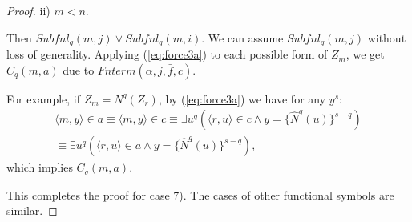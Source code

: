 \documentclass{asl}
\theoremstyle{definition}
\begin{document}
\begin{proof}
ii) $m<n$.

Then $Subfnl_q(m,j)\vee Subfnl_q(m,i)$. We can assume $Subfnl_q(m,j)$ without loss of generality. Applying (\ref{eq:force3a}) to each possible form of $Z_m$, we get $C_q(m,a)$ due to $Fnterm(\alpha,j,\bar{f},c)$. 

For example, if $Z_m=N^q(Z_r)$, by (\ref{eq:force3a}) we have for any $y^s$:
\begin{multline*}
\langle m,y\rangle\in a\equiv\langle m,y\rangle\in c\equiv\exists u^q\left(\langle r,u\rangle\in c\wedge y=\lbrace \hat{N}^q(u)\rbrace^{s-q}\right)
\\
\equiv\exists u^q\left(\langle r,u\rangle\in a\wedge y=\lbrace \hat{N}^q(u)\rbrace^{s-q}\right),
\end{multline*}
which implies $C_q(m,a)$.

This completes the proof for case 7). The cases of other functional symbols are similar.
\end{proof}
\end{document}
